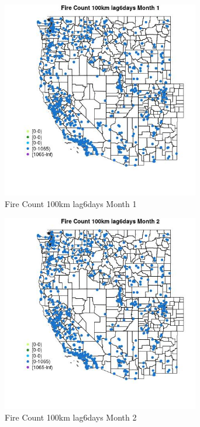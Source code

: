 \begin{figure} 
\centering  
\includegraphics[width=0.77\textwidth]{Code_Outputs/Report_ML_input_PM25_Step4_part_f_de_duplicated_aveswNAs_MapObsMo1Fire_Count_100km_lag6days.jpg} 
\caption{\label{fig:Report_ML_input_PM25_Step4_part_f_de_duplicated_aveswNAsMapObsMo1Fire_Count_100km_lag6days}Fire Count 100km lag6days Month 1} 
\end{figure} 
 

\begin{figure} 
\centering  
\includegraphics[width=0.77\textwidth]{Code_Outputs/Report_ML_input_PM25_Step4_part_f_de_duplicated_aveswNAs_MapObsMo2Fire_Count_100km_lag6days.jpg} 
\caption{\label{fig:Report_ML_input_PM25_Step4_part_f_de_duplicated_aveswNAsMapObsMo2Fire_Count_100km_lag6days}Fire Count 100km lag6days Month 2} 
\end{figure} 
 

